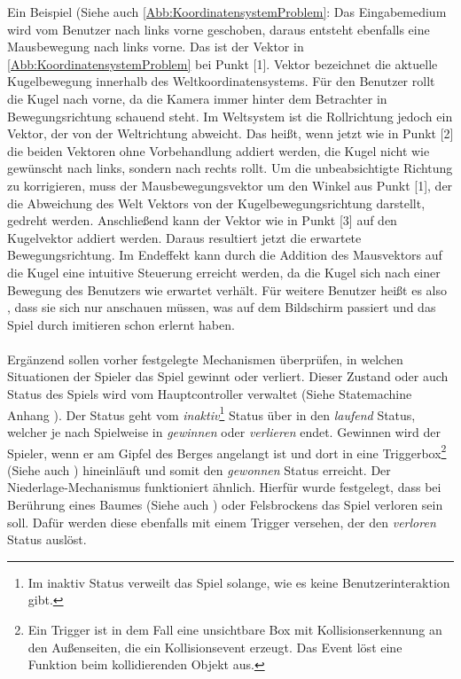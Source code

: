 Ein Beispiel (Siehe auch \autoref{Abb:KoordinatensystemProblem}: Das Eingabemedium wird vom Benutzer nach links vorne geschoben, daraus entsteht ebenfalls eine Mausbewegung nach links vorne. Das ist der Vektor  in \autoref{Abb:KoordinatensystemProblem} bei Punkt [1]. Vektor  bezeichnet die aktuelle Kugelbewegung innerhalb des Weltkoordinatensystems. Für den Benutzer rollt die Kugel nach vorne, da die Kamera immer hinter dem Betrachter in Bewegungsrichtung schauend steht. Im Weltsystem ist die Rollrichtung jedoch ein Vektor, der von der Weltrichtung  abweicht. Das heißt, wenn jetzt wie in Punkt [2] die beiden Vektoren ohne Vorbehandlung addiert werden, die Kugel nicht wie gewünscht nach links, sondern nach rechts rollt. Um die unbeabsichtigte Richtung zu korrigieren, muss der Mausbewegungsvektor  um den Winkel \alp{} aus Punkt [1], der die Abweichung des Welt  Vektors von der Kugelbewegungsrichtung darstellt, gedreht werden. Anschließend kann der  Vektor wie in Punkt [3] auf den Kugelvektor  addiert werden. Daraus resultiert jetzt die erwartete Bewegungsrichtung. Im Endeffekt kann durch die Addition des Mausvektors auf die Kugel eine intuitive Steuerung erreicht werden, da die Kugel sich nach einer Bewegung des Benutzers wie erwartet verhält. Für weitere Benutzer heißt es also , dass sie sich nur anschauen müssen, was auf dem Bildschirm passiert und das Spiel durch imitieren schon erlernt haben.

\paragraph{}
Ergänzend sollen vorher festgelegte Mechanismen überprüfen, in welchen Situationen der Spieler das Spiel gewinnt oder verliert. Dieser Zustand oder auch Status des Spiels wird vom Hauptcontroller verwaltet (Siehe Statemachine Anhang ). Der Status geht vom \textit{inaktiv}\footnote{Im inaktiv Status verweilt das Spiel solange, wie es keine Benutzerinteraktion gibt.} Status über in den \textit{laufend} Status, welcher je nach Spielweise in \textit{gewinnen} oder \textit{verlieren} endet. Gewinnen wird der Spieler, wenn er am Gipfel des Berges angelangt ist und dort in eine Triggerbox\footnote{Ein Trigger ist in dem Fall eine unsichtbare Box mit Kollisionserkennung an den Außenseiten, die ein Kollisionsevent erzeugt. Das Event löst eine Funktion beim kollidierenden Objekt aus.} (Siehe auch ) hineinläuft und somit den \textit{gewonnen} Status erreicht. Der Niederlage-Mechanismus funktioniert ähnlich. Hierfür wurde festgelegt, dass bei Berührung eines Baumes (Siehe auch ) oder Felsbrockens das Spiel verloren sein soll. Dafür werden diese ebenfalls mit einem Trigger versehen, der den \textit{verloren} Status auslöst.
